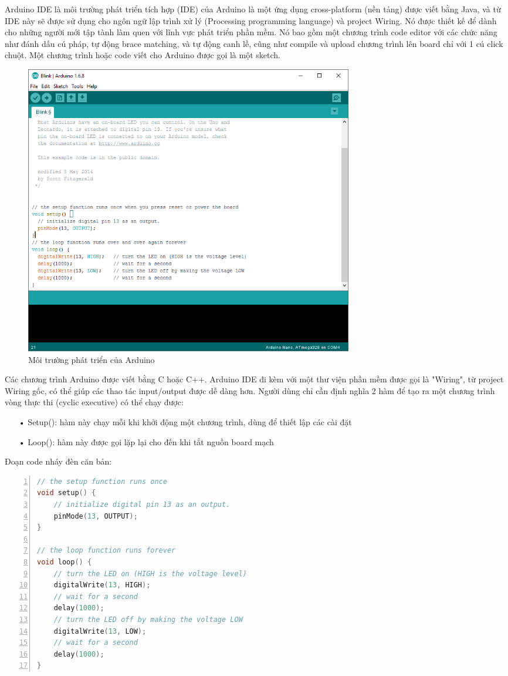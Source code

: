 Arduino IDE là môi trường phát triển tích hợp (IDE) của Arduino là một ứng dụng cross-platform (nền tảng) được viết bằng Java, và từ IDE này sẽ được sử dụng cho ngôn ngữ lập trình xử lý (Processing programming language) và project Wiring. Nó được thiết kế để dành cho những người mới tập tành làm quen với lĩnh vực phát triển phần mềm. Nó bao gồm một chương trình code editor với các chức năng như đánh dấu cú pháp, tự động brace matching, và tự động canh lề, cũng như compile và upload chương trình lên board chỉ với 1 cú click chuột. Một chương trình hoặc code viết cho Arduino được gọi là một sketch.

\begin{figure}[H]
	\centering    
	\includegraphics[width=0.7\textwidth]{arduinonano_ide}
	\caption[Môi trường phát triển của Arduino]{Môi trường phát triển của Arduino}
	\label{fig:arduinonano_ide}
\end{figure}

Các chương trình Arduino được viết bằng C hoặc C++. Arduino IDE đi kèm với một thư viện phần mềm được gọi là "Wiring", từ project Wiring gốc, có thể giúp các thao tác input/output được dễ dàng hơn. Người dùng chỉ cần định nghĩa 2 hàm để tạo ra một chương trình vòng thực thi (cyclic executive) có thể chạy được:
\begin{itemize}
	\item[•]Setup(): hàm này chạy mỗi khi khởi động một chương trình, dùng để thiết lập
	các cài đặt
	\item[•]Loop(): hàm này được gọi lặp lại cho đến khi tắt nguồn board mạch
\end{itemize}

Đoạn code nháy đèn căn bản:
\begin{lstlisting}[numbers=left,firstnumber=1,language=C]
// the setup function runs once
void setup() {
	// initialize digital pin 13 as an output.
	pinMode(13, OUTPUT);
}

// the loop function runs forever
void loop() {
	// turn the LED on (HIGH is the voltage level)
	digitalWrite(13, HIGH);   
	// wait for a second
	delay(1000);    
	// turn the LED off by making the voltage LOW          
	digitalWrite(13, LOW);    
	// wait for a second
	delay(1000);              
}

\end{lstlisting}







